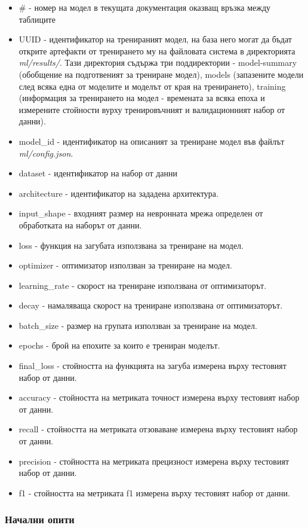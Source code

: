\documentclass{article}
\begin{document}
\begin{itemize}
\item \# - номер на модел в текущата документация оказващ връзка между таблиците
\item UUID - идентификатор на тренираният модел, на база него могат да бъдат открите артефакти от тренирането му на
файловата система в директорията \textit{ml/results/}. Тази директория съдържа три поддиректории - model-summary
(обобщение на подготвеният за трениране модел), models (запазените модели след всяка една от моделите и моделът от
края на тренирането), training (информация за тренирането на модел - времената за всяка епоха и измерените стойности
вурху тренировъчният и валидационният набор от данни).
\item model\_id - идентификатор на описаният за трениране модел във файлът \textit{ml/config.json}.
\item dataset - идентификатор на набор от данни
\item architecture - идентификатор на зададена архитектура.
\item input\_shape - входният размер на невронната мрежа определен от обработката на наборът от данни.
\item loss - функция на загубата използвана за трениране на модел.
\item optimizer - оптимизатор използван за трениране на модел.
\item learning\_rate - скорост на трениране използвана от оптимизаторът.
\item decay - намаляваща скорост на трениране използвана от оптимизаторът.
\item batch\_size - размер на групата използван за трениране на модел.
\item epochs - брой на епохите за които е трениран моделът.
\item final\_loss - стойността на функцията на загуба измерена върху тестовият набор от данни.
\item accuracy - стойността на метриката точност измерена върху тестовият набор от данни.
\item recall - стойността на метриката отзоваване измерена върху тестовият набор от данни.
\item precision - стойността на метриката прецизност измерена върху тестовият набор от данни.
\item f1 - стойността на метриката f1 измерена върху тестовият набор от данни.
\end{itemize}

\subsubsection{Начални опити}
\end{document}
